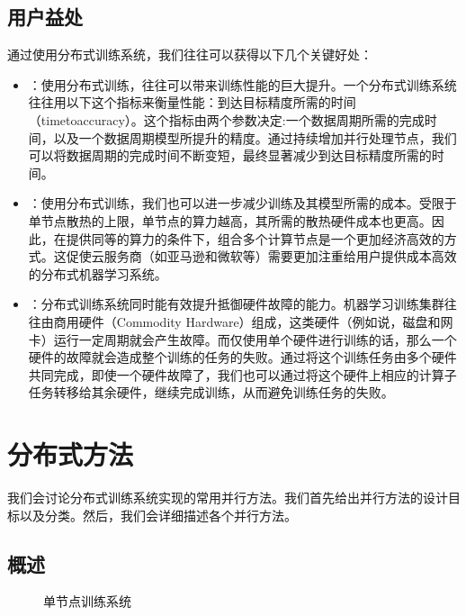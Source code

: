 \documentclass[letterpaper,10pt,english]{sphinxmanual}
\let\sphinxpxdimen\pdfpxdimen\else\newdimen\sphinxpxdimen
\begin{document}
\subsection{用户益处}
\label{\detokenize{chapter_distributed_training/overview:id6}}
\sphinxAtStartPar
通过使用分布式训练系统，我们往往可以获得以下几个关键好处：
\begin{itemize}
\item {} 
\sphinxAtStartPar
{}：使用分布式训练，往往可以带来训练性能的巨大提升。一个分布式训练系统往往用以下这个指标来衡量性能：到达目标精度所需的时间（time\sphinxhyphen{}to\sphinxhyphen{}accuracy）。这个指标由两个参数决定:一个数据周期所需的完成时间，以及一个数据周期模型所提升的精度。通过持续增加并行处理节点，我们可以将数据周期的完成时间不断变短，最终显著减少到达目标精度所需的时间。

\item {} 
\sphinxAtStartPar
{}：使用分布式训练，我们也可以进一步减少训练及其模型所需的成本。受限于单节点散热的上限，单节点的算力越高，其所需的散热硬件成本也更高。因此，在提供同等的算力的条件下，组合多个计算节点是一个更加经济高效的方式。这促使云服务商（如亚马逊和微软等）需要更加注重给用户提供成本高效的分布式机器学习系统。

\item {} 
\sphinxAtStartPar
{}：分布式训练系统同时能有效提升抵御硬件故障的能力。机器学习训练集群往往由商用硬件（Commodity
Hardware）组成，这类硬件（例如说，磁盘和网卡）运行一定周期就会产生故障。而仅使用单个硬件进行训练的话，那么一个硬件的故障就会造成整个训练的任务的失败。通过将这个训练任务由多个硬件共同完成，即使一个硬件故障了，我们也可以通过将这个硬件上相应的计算子任务转移给其余硬件，继续完成训练，从而避免训练任务的失败。

\end{itemize}


\section{分布式方法}
\label{\detokenize{chapter_distributed_training/methods:id1}}\label{\detokenize{chapter_distributed_training/methods::doc}}
\sphinxAtStartPar
我们会讨论分布式训练系统实现的常用并行方法。我们首先给出并行方法的设计目标以及分类。然后，我们会详细描述各个并行方法。


\subsection{概述}
\label{\detokenize{chapter_distributed_training/methods:id2}}
\begin{figure}[H]
\centering
\capstart

\noindent\sphinxincludegraphics[width=800\sphinxpxdimen]{{ch10-single-node}.png}
\caption{单节点训练系统}\label{\detokenize{chapter_distributed_training/methods:id6}}\label{\detokenize{chapter_distributed_training/methods:ch10-single-node}}\end{figure}
\end{document}
